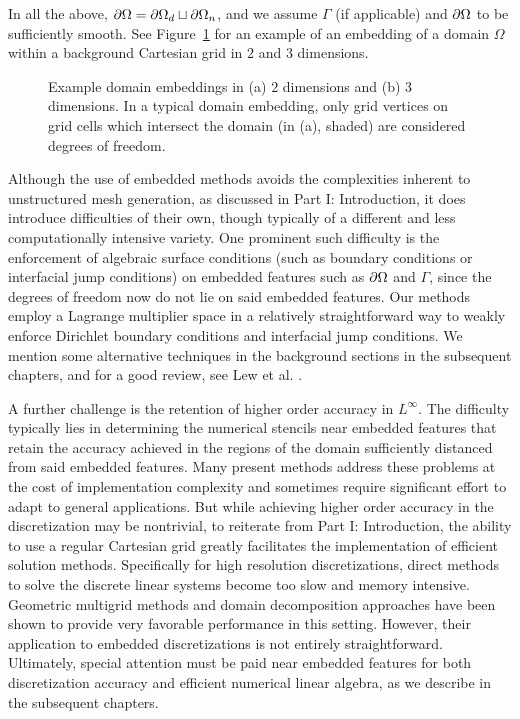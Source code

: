 In all the above, $\partial\Omega = \partial\Omega_d \sqcup \partial\Omega_n$, and we assume $\Gamma$ (if applicable) and $\partial\Omega$ to be sufficiently smooth. See Figure~\ref{fig:pt2.embedding} for an example of an embedding of a domain $\Omega$ within a background Cartesian grid in $2$ and $3$ dimensions.

\setlength{\figureheight}{0.50\textwidth}
\begin{figure}[htb]
\centering
{}
\caption{Example domain embeddings in (a) $2$ dimensions and (b) $3$ dimensions. In a typical domain embedding, only grid vertices on grid cells which intersect the domain (in (a), shaded) are considered degrees of freedom.}
\label{fig:pt2.embedding}
\end{figure}

Although the use of embedded methods avoids the complexities inherent to unstructured mesh generation, as discussed in Part I: Introduction, it does introduce difficulties of their own, though typically of a different and less computationally intensive variety. One prominent such difficulty is the enforcement of algebraic surface conditions (such as boundary conditions or interfacial jump conditions) on embedded features such as $\partial\Omega$ and $\Gamma$, since the degrees of freedom now do not lie on said embedded features. Our methods employ a Lagrange multiplier space in a relatively straightforward way to weakly enforce Dirichlet boundary conditions and interfacial jump conditions. We mention some alternative techniques in the background sections in the subsequent chapters, and for a good review, see Lew et al. \cite{Lew.Adrian08}.

A further challenge is the retention of higher order accuracy in $L^{\infty}$. The difficulty typically lies in determining the numerical stencils near embedded features that retain the accuracy achieved in the regions of the domain sufficiently distanced from said embedded features. Many present methods address these problems at the cost of implementation complexity and sometimes require significant effort to adapt to general applications. But while achieving higher order accuracy in the discretization may be nontrivial, to reiterate from Part I: Introduction, the ability to use a regular Cartesian grid greatly facilitates the implementation of efficient solution methods. Specifically for high resolution discretizations, direct methods to solve the discrete linear systems become too slow and memory intensive. Geometric multigrid methods and domain decomposition approaches have been shown to provide very favorable performance in this setting. However, their application to embedded discretizations is not entirely straightforward. Ultimately, special attention must be paid near embedded features for both discretization accuracy and efficient numerical linear algebra, as we describe in the subsequent chapters.

